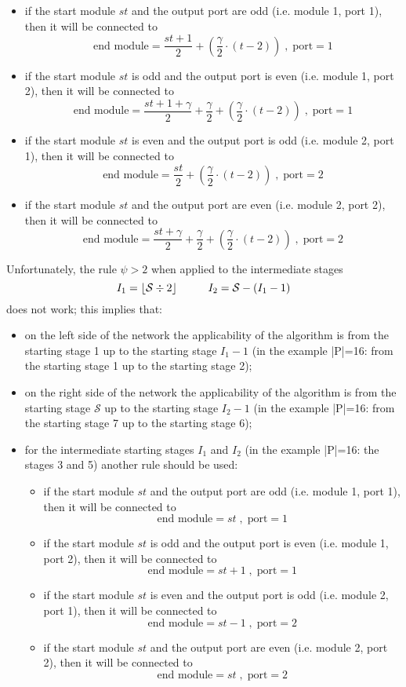 \documentclass{ltxdoc}
\begin{document}
\begin{itemize}
\begin{itemize}
\item if the start module $st$ and the output port are odd (i.e. module 1, port 1), then it will be connected to  
\[\textrm{end module}=\dfrac{st+1}{2}+\left(\dfrac{\gamma}{2}\cdot (t-2)\right) \; , \; \textrm{port}=1 \]
\item if the start module $st$ is odd and the output port is even (i.e. module 1, port 2), then it will be connected to  
\[\textrm{end module}=\dfrac{st+1+\gamma}{2}+\dfrac{\gamma}{2}+\left(\dfrac{\gamma}{2}\cdot (t-2)\right)\; , \; \textrm{port}=1 \]
\item if the start module $st$ is even and the output port is odd (i.e. module 2, port 1), then it will be connected to  
\[\textrm{end module}=\dfrac{st}{2}+\left(\dfrac{\gamma}{2}\cdot (t-2)\right)\; , \; \textrm{port}=2 \]
\item if the start module $st$ and the output port are even (i.e. module 2, port 2), then it will be connected to  
\[\textrm{end module}=\dfrac{st+\gamma}{2}+\dfrac{\gamma}{2}+\left(\dfrac{\gamma}{2}\cdot (t-2)\right)\; , \; \textrm{port}=2 \]
\end{itemize}
\end{itemize}
Unfortunately, the rule $\psi>2$ when applied to the intermediate stages 
\[I_1=\lfloor\mathcal{S}\div 2\rfloor \hspace*{1cm} I_2=\mathcal{S}-(I_1-1)\]
does not work; this implies that:
\begin{itemize}
\item on the left side of the network the applicability of the algorithm is from the starting stage 1 up to the starting stage $I_1-1$ (in the example |P|=16: from the starting stage 1 up to the starting stage 2);
\item on the right side of the network the applicability of the algorithm is from the starting stage $\mathcal{S}$ up to the starting stage $I_2-1$ (in the example |P|=16: from the starting stage 7 up to the starting stage 6);
\item for the intermediate starting stages $I_1$ and  $I_2$ (in the example |P|=16: the stages 3 and 5) another rule should be used:
\begin{itemize}
\item if the start module $st$ and the output port are odd (i.e. module 1, port 1), then it will be connected to  
\[\textrm{end module}=st\; , \; \textrm{port}=1 \]
\item if the start module $st$ is odd and the output port is even (i.e. module 1, port 2), then it will be connected to  
\[\textrm{end module}=st+1\; , \; \textrm{port}=1 \]
\item if the start module $st$ is even and the output port is odd (i.e. module 2, port 1), then it will be connected to  
\[\textrm{end module}=st-1  \; , \; \textrm{port}=2 \]
\item if the start module $st$ and the output port are even (i.e. module 2, port 2), then it will be connected to  
\[\textrm{end module}=st\; , \; \textrm{port}=2 \]
\end{itemize}
\end{itemize}
\end{document}
